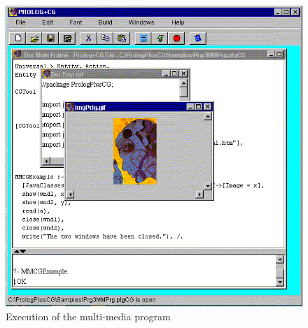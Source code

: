 \documentclass{book}
\begin{document}
\begin{latexonly}

\begin{figure}
\begin{center}
\includegraphics[scale=0.5]{MMPrgExec.png}
\end{center}
\caption{\label{MMPrgExec}Execution of the multi-media program}
\end{figure}

\end{latexonly}
\end{document}
